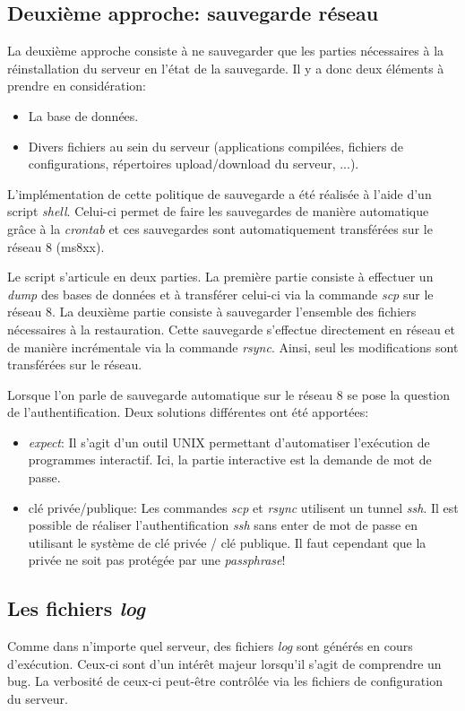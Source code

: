 \documentclass[a4paper, 11pt]{report}
\begin{document}
\subsection{Deuxième approche: sauvegarde réseau}
La deuxième approche consiste à ne sauvegarder que les parties nécessaires à la réinstallation du serveur en l'état de la sauvegarde. Il y a donc deux éléments à prendre en considération:
\begin{itemize}
\item La base de données.
\item Divers fichiers au sein du serveur (applications compilées, fichiers de configurations, répertoires upload/download du serveur, ...).
\end{itemize} 

L'implémentation de cette politique de sauvegarde a été réalisée à l'aide d'un script \textit{shell}. Celui-ci permet de faire les sauvegardes de manière automatique grâce à la \textit{crontab} et ces sauvegardes sont automatiquement transférées sur le réseau 8 (ms8xx). 

Le script s'articule en deux parties. La première partie consiste à effectuer un \textit{dump} des bases de données et à transférer celui-ci via la commande \textit{scp} sur le réseau 8. La deuxième partie consiste à sauvegarder l'ensemble des fichiers nécessaires à la restauration. Cette sauvegarde s'effectue directement en réseau et de manière incrémentale via la commande \textit{rsync}. Ainsi, seul les modifications sont transférées sur le réseau. %

Lorsque l'on parle de sauvegarde automatique sur le réseau 8 se pose la question de l'authentification. Deux solutions différentes ont été apportées:
\begin{itemize}
\item \textit{expect}: Il s'agit d'un outil UNIX permettant d'automatiser l'exécution de programmes interactif. Ici, la partie interactive est la demande de mot de passe.
\item clé privée/publique: Les commandes \textit{scp} et \textit{rsync} utilisent un tunnel \textit{ssh}. Il est possible de réaliser l'authentification \textit{ssh} sans enter de mot de passe en utilisant le système de clé privée / clé publique. Il faut cependant que la privée ne soit pas protégée par une \textit{passphrase}! 
\end{itemize}

\subsection{Les fichiers \textit{log}}
Comme dans n'importe quel serveur, des fichiers \textit{log} sont générés en cours d'exécution. Ceux-ci sont d'un intérêt majeur lorsqu'il s'agit de comprendre un bug. La verbosité de ceux-ci peut-être contrôlée via les fichiers de configuration du serveur. 
\end{document}
